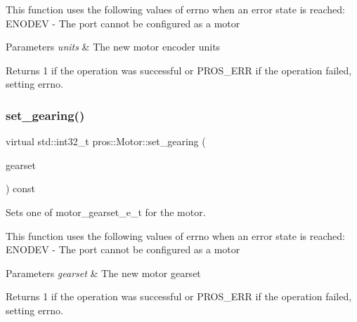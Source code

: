 This function uses the following values of errno when an error state is reached\+: E\+N\+O\+D\+EV -\/ The port cannot be configured as a motor


\begin{DoxyParams}{Parameters}
{\em units} & The new motor encoder units\\
\hline
\end{DoxyParams}
\begin{DoxyReturn}{Returns}
1 if the operation was successful or P\+R\+O\+S\+\_\+\+E\+RR if the operation failed, setting errno. 
\end{DoxyReturn}
\mbox{\label{classpros_1_1Motor_a3adf8b737ad2e4ebb5f000401c536fed}} 
\subsubsection{\texorpdfstring{set\+\_\+gearing()}{set\_gearing()}}
{\footnotesize\ttfamily virtual std\+::int32\+\_\+t pros\+::\+Motor\+::set\+\_\+gearing (\begin{DoxyParamCaption}\item[{const \hyperlink{motors_8h_aa2f1c305c998abc3bf8dd1f76fa4da8b}{motor\+\_\+gearset\+\_\+e\+\_\+t}}]{gearset }\end{DoxyParamCaption}) const\hspace{0.3cm}{\ttfamily [virtual]}}



Sets one of motor\+\_\+gearset\+\_\+e\+\_\+t for the motor. 

This function uses the following values of errno when an error state is reached\+: E\+N\+O\+D\+EV -\/ The port cannot be configured as a motor


\begin{DoxyParams}{Parameters}
{\em gearset} & The new motor gearset\\
\hline
\end{DoxyParams}
\begin{DoxyReturn}{Returns}
1 if the operation was successful or P\+R\+O\+S\+\_\+\+E\+RR if the operation failed, setting errno. 
\end{DoxyReturn}
\mbox{\label{classpros_1_1Motor_a7a42563b94124faebb50e5731d5664ad}} 
